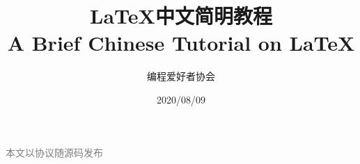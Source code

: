 
\begin{titlepage}
	\title{\bf \LaTeX 中文简明教程 \\ A Brief Chinese Tutorial on \LaTeX}
	\author{编程爱好者协会}
	\date{2020/08/09}
	\maketitle
	\begin{center}
		\textcolor{gray}{本文以\licenseName 协议随源码发布}\\[2cm]
		\bigorglogo
	\end{center}
	\thispagestyle{empty}
	\newpage
\end{titlepage}
